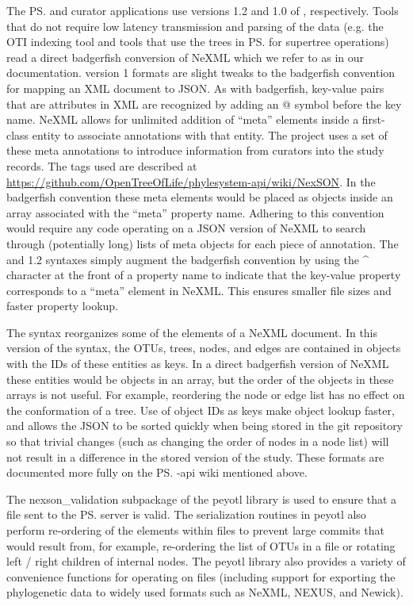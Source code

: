 \begin{methods}
The \ps and curator \js applications use versions 1.2 and 1.0 of \nexson, respectively.
Tools that do not require low latency transmission and parsing of the data (e.g. the OTI indexing tool
    and tools that use the trees in \ps for supertree operations)
    read a direct badgerfish \citep{badgerfish} conversion of NeXML which we refer to as  in our documentation.
\nexson version 1 formats are slight tweaks to the badgerfish convention for mapping an XML document to JSON.
As with badgerfish, key-value pairs that are attributes in XML are recognized by adding an @ symbol before the key name.
NeXML allows for unlimited addition of ``meta'' elements inside a first-class entity to associate annotations with that entity.
The \otol project uses a set of these meta annotations to introduce information from curators into the study records.
The tags used are described at \url{https://github.com/OpenTreeOfLife/phylesystem-api/wiki/NexSON}.
In the badgerfish convention these meta elements would be placed as \js objects inside an array associated with the ``meta'' property name.
Adhering to this convention would require any code operating on a JSON version of NeXML to search through (potentially
    long) lists of meta objects for each piece of annotation.
The  and 1.2 syntaxes simply augment the badgerfish convention by using the \^{} character at the front of a
    property name to indicate that the key-value property corresponds to a ``meta'' element in NeXML.
This ensures smaller file sizes and faster property lookup.

The  syntax reorganizes some of the elements of a NeXML document.
In this version of the syntax, the OTUs, trees, nodes, and edges are contained in objects with the IDs of these entities as keys.
In a direct badgerfish version of NeXML these entities would be objects in an array, but the order of the objects
    in these arrays is not useful.
For example, reordering the node or edge list has no effect on the conformation of a tree.
Use of object IDs as keys make object lookup faster, and allows the JSON to be sorted quickly when being stored in 
    the git repository so that trivial changes (such as changing the order of nodes in a node list) will not result in 
    a difference in the stored version of the study.
These formats are documented more fully on the \ps-api wiki mentioned above.

The nexson\_validation subpackage of the peyotl library is used to ensure that a \nexson file sent to the \ps
    server is valid.
The serialization routines in peyotl also perform re-ordering of the elements within \nexson files to
    prevent large commits that would result from, for example, re-ordering the list of OTUs in a file or
    rotating left / right children of internal nodes.
The peyotl library also 
    provides a variety of convenience functions for operating on \nexson files (including support
    for exporting the phylogenetic data to widely used formats such as NeXML, NEXUS, and Newick).


\end{methods}
